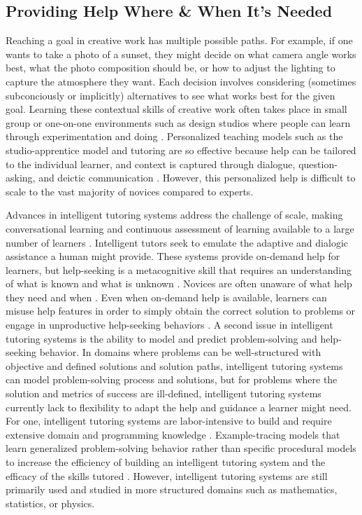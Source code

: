 \subsection{Providing Help Where \& When It's Needed}
Reaching a goal in creative work has multiple possible paths. For example, if one wants to take a photo of a sunset, they might decide on what camera angle works best, what the photo composition should be, or how to adjust the lighting to capture the atmosphere they want. Each decision involves considering (sometimes subconciously or implicitly) alternatives to see what works best for the given goal. Learning these contextual skills of creative work often takes  place in small group or one-on-one environments such as design studios where people can learn through experimentation and doing \cite{klemmer2006themes}. Personalized teaching models such as the studio-apprentice model and tutoring are so effective because help can be tailored to the individual learner, and context is captured through dialogue, question-asking, and deictic communication \cite{bloom1984, Chi2001, Chi2010, goldin1999, Graesser1994, Graesser1995, klemmer2006themes, schon1984reflective}. However, this personalized help is difficult to scale to the vast majority of novices compared to experts. 

Advances in intelligent tutoring systems address the challenge of scale, making conversational learning and continuous assessment of learning available to a large number of learners \cite{Aleven2010,Anderson1995, Graesser2001, Koedinger1997, Roscoe2014}. Intelligent tutors seek to emulate the adaptive and dialogic assistance a human might provide. These systems provide on-demand help for learners, but help-seeking is a metacognitive skill that requires an understanding of what is known and what is unknown \cite{Flavell1979}. Novices are often unaware of what help they need and when \cite{aleven2013help, aleven2003help, Graesser1994, Graesser1995}. Even when on-demand help is available, learners can misuse help features in order to simply obtain the correct solution to problems \cite{baker2004detecting} or engage in unproductive help-seeking behaviors \cite{aleven2004toward, aleven2016help}. A second issue in intelligent tutoring systems is the ability to model and predict problem-solving and help-seeking behavior. In domains where problems can be well-structured with objective and defined solutions and solution paths, intelligent tutoring systems can model problem-solving process and solutions, but for problems where the solution and metrics of success are ill-defined, intelligent tutoring systems currently lack to flexibility to adapt the help and guidance a learner might need. For one, intelligent tutoring systems are labor-intensive to build and require extensive domain and programming knowledge \cite{woolf2010building}. Example-tracing models that learn generalized problem-solving behavior rather than specific procedural models to increase the efficiency of building an intelligent tutoring system and the efficacy of the skills tutored \cite{aleven2009new}. However, intelligent tutoring systems are still primarily used and studied in more structured domains such as mathematics, statistics, or physics.

